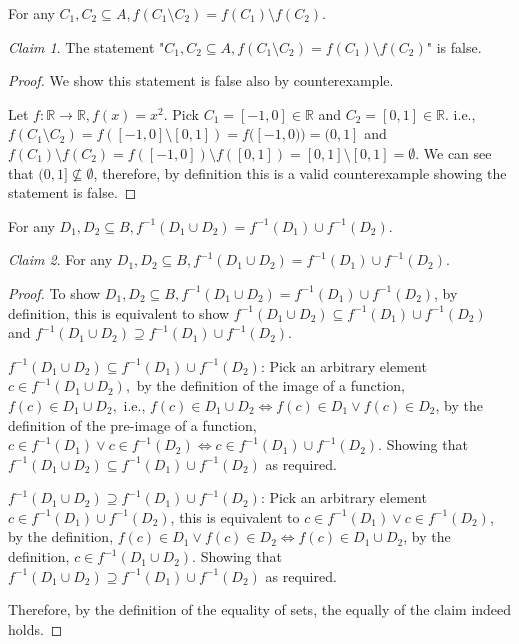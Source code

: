 \documentclass{homework}
\theoremstyle{remark}
\newtheorem*{claim}{Claim}
\newcommand{\?}{\stackrel{?}{=}}
\begin{document}

     



\question For any $C_1, C_2 \subseteq A, f(C_1\setminus C_2)=f(C_1)\setminus f(C_2)$. 
\begin{claim}
    The statement "$C_1, C_2 \subseteq A, f(C_1\setminus C_2)=f(C_1)\setminus f(C_2)$" is false.
\end{claim}
\begin{proof}
    We show this statement is false also by counterexample.  
    
    Let $f: \mathbb{R}\rightarrow \mathbb{R}, f(x)=x^2$. Pick $C_1=[-1,0]\in\mathbb{R}$ and $C_2=[0,1]\in\mathbb{R}$. i.e., $f(C_1\setminus C_2)=f([-1,0]\setminus[0,1])=f([-1,0))=(0,1]$ and $f(C_1)\setminus f(C_2)=f([-1,0])\setminus f([0,1])=[0,1]\setminus[0,1]=\emptyset$. We can see that $(0,1]\not\subseteq\emptyset$, therefore, by definition this is a valid counterexample showing the statement is false. 
\end{proof}
\question For any $D_1, D_2 \subseteq B, f^{-1}(D_1\cup D_2)=f^{-1}(D_1)\cup f^{-1}(D_2).$ 
\begin{claim}
    For any $D_1, D_2 \subseteq B, f^{-1}(D_1\cup D_2)=f^{-1}(D_1)\cup f^{-1}(D_2).$ 
\end{claim}
\begin{proof}
    To show $D_1, D_2 \subseteq B, f^{-1}(D_1\cup D_2)=f^{-1}(D_1)\cup f^{-1}(D_2)$, by definition, this is equivalent to show $f^{-1}(D_1\cup D_2)\subseteq f^{-1}(D_1)\cup f^{-1}(D_2)$  and $f^{-1}(D_1\cup D_2)\supseteq f^{-1}(D_1)\cup f^{-1}(D_2)$. 

    \underline{$f^{-1}(D_1\cup D_2)\subseteq f^{-1}(D_1)\cup f^{-1}(D_2)$}:  Pick an arbitrary element $c\in f^{-1}(D_1\cup D_2),$ by the definition of the image of a function, $f(c)\in D_1\cup D_2,$ i.e., $f(c)\in D_1\cup D_2 \iff f(c)\in D_1 \lor f(c)\in D_2$, by the definition of the pre-image of a function, $c\in f^{-1}(D_1)\lor c\in f^{-1}(D_2)\iff c\in f^{-1}(D_1)\cup f^{-1}(D_2)$. Showing that $f^{-1}(D_1\cup D_2)\subseteq f^{-1}(D_1)\cup f^{-1}(D_2)$ as required. 

    \underline{$f^{-1}(D_1\cup D_2)\supseteq f^{-1}(D_1)\cup f^{-1}(D_2)$}: Pick an arbitrary element $c\in f^{-1}(D_1)\cup f^{-1}(D_2)$, this is equivalent to $c\in f^{-1}(D_1)\lor c\in f^{-1}(D_2)$, by the definition, $f(c)\in D_1 \lor f(c)\in D_2\iff f(c)\in D_1\cup D_2$, by the definition, $c\in f^{-1}(D_1\cup D_2)$. Showing that $f^{-1}(D_1\cup D_2)\supseteq f^{-1}(D_1)\cup f^{-1}(D_2)$ as required. 

    Therefore, by the definition of the equality of sets, the equally of the claim indeed holds. 
\end{proof}
\end{document}
